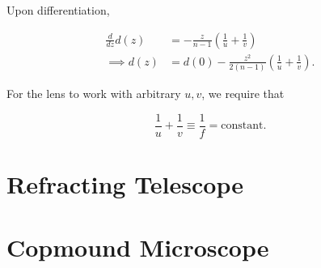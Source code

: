 \documentclass[english,a4paper,12pt]{report}
\begin{document}
Upon differentiation, 

\begin{equation}
    \begin{aligned} 
    \frac{d}{dz}d(z) &= -\frac{z}{n-1}(\frac{1}{u} + \frac{1}{v}  ) \\
    \implies  d(z) &= d(0) - \frac{z^2}{2(n-1)} \left( \frac{1}{u} + \frac{1}{v}   \right).   
    \end{aligned} 
\end{equation}

For the lens to work with arbitrary \(u, v\), we require that 

\begin{equation}
    \frac{1}{u} + \frac{1}{v} \equiv \frac{1}{f} = \text{constant}.    
\end{equation}





\section{Refracting Telescope}

\section{Copmound Microscope}
\end{document}
